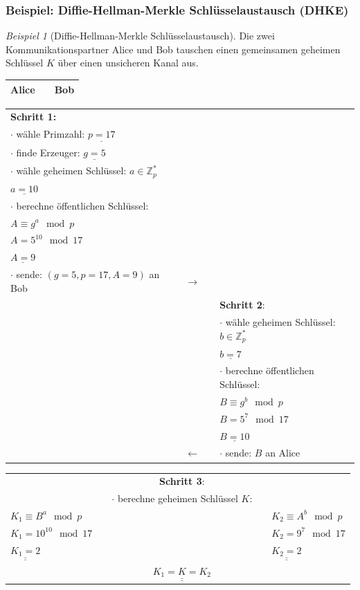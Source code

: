 \documentclass[
  a4paper,
  11pt,
]{scrartcl}
\theoremstyle{plain}
\theoremstyle{definition}
\theoremstyle{remark}
\newtheorem{beispiel}{Beispiel}
\newcommand{\Z}{\mathbb{Z}}
\def\doubleunderline#1{\underline{\underline{#1}}} %
\begin{document}
\subsubsection{Beispiel: Diffie-Hellman-Merkle Schlüsselaustausch (DHKE)}
\label{sub:dhke_beispiel}
\begin{beispiel}[Diffie-Hellman-Merkle Schlüsselaustausch]\label{bsp:dhke}
Die zwei Kommunikationspartner Alice und Bob tauschen einen gemeinsamen geheimen Schlüssel $K$ über einen unsicheren Kanal aus.
	\begin{center}
	    \begin{tabularx}{\textwidth}{lXr}
	    	\textbf{Alice} & \text{ } & \textbf{Bob}\\\midrule
	    \end{tabularx}
	    \begin{tabularx}{\textwidth}{lXcXl}
	    	\textbf{Schritt 1:} & & & & \\
	    	$\cdot$ wähle Primzahl: $\underline{p = 17}$ & & & & \\
	    	$\cdot$ finde Erzeuger: $\underline{g = 5}$ & & & & \\
	    	$\cdot$ wähle geheimen Schlüssel: $a \in \Z_p^*$ & & & & \\
	    	$\underline{a = 10}$ & & & & \\
	    	$\cdot$ berechne öffentlichen Schlüssel: & & & & \\
	    	$A \equiv g^a \mod p$ & & & & \\
	    	$A = 5^{10} \mod 17$ & & & & \\
	    	$\underline{A = 9}$ & & & & \\
	    	$\cdot$ sende: $(g = 5, p = 17, A = 9)$ an Bob & & $\to$ & & \\\midrule
	    	& & & & \textbf{Schritt 2}:\\
	    	& & & & $\cdot$ wähle geheimen Schlüssel: $b \in \Z_p^*$\\
			& & & & $\underline{b=7}$\\
	    	& & & & $\cdot$ berechne öffentlichen Schlüssel:\\
	    	& & & & $B \equiv g^b \mod p$\\
	    	& & & & $B = 5^7 \mod 17$\\
	    	& & & & $\underline{B = 10}$\\
	    	& & $\leftarrow$ & & $\cdot$ sende: $B$ an Alice\\\midrule
	    \end{tabularx}
	    \begin{tabularx}{\textwidth}{lXcXl}
	    	& & \textbf{Schritt 3}: & & \\
	    	& & $\cdot$ berechne geheimen Schlüssel $K$: & & \\
	    	$K_1 \equiv B^a \mod p$ & & & & $K_2 \equiv A^b \mod p$\\
	    	$K_1 = 10^{10} \mod 17$ & & & & $K_2 = 9^7 \mod 17$\\
	    	$\doubleunderline{K_1 = 2}$ & & & & $\doubleunderline{K_2 = 2}$\\
	    	& & $\doubleunderline{K_1 = K = K_2}$ & &
	    \end{tabularx}
	\end{center}
\end{beispiel}
\end{document}
